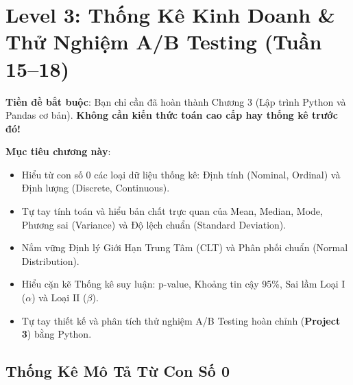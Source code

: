 \chapter{Level 3: Thống Kê Kinh Doanh \& Thử Nghiệm A/B Testing (Tuần 15--18)}

\begin{lythuyetbox}
\textbf{Tiền đề bắt buộc}: Bạn chỉ cần đã hoàn thành Chương 3 (Lập trình Python và Pandas cơ bản). \textbf{Không cần kiến thức toán cao cấp hay thống kê trước đó!}

\textbf{Mục tiêu chương này}:
\begin{itemize}
    \item Hiểu từ con số 0 các loại dữ liệu thống kê: Định tính (Nominal, Ordinal) và Định lượng (Discrete, Continuous).
    \item Tự tay tính toán và hiểu bản chất trực quan của Mean, Median, Mode, Phương sai (Variance) và Độ lệch chuẩn (Standard Deviation).
    \item Nắm vững Định lý Giới Hạn Trung Tâm (CLT) và Phân phối chuẩn (Normal Distribution).
    \item Hiểu cặn kẽ Thống kê suy luận: p-value, Khoảng tin cậy 95\%, Sai lầm Loại I ($\alpha$) và Loại II ($\beta$).
    \item Tự tay thiết kế và phân tích thử nghiệm A/B Testing hoàn chỉnh (\textbf{Project 3}) bằng Python.
\end{itemize}
\end{lythuyetbox}

\section{Thống Kê Mô Tả Từ Con Số 0}

